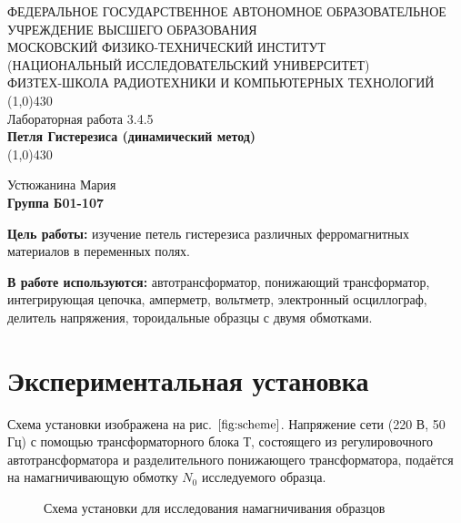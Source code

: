 \documentclass[11pt]{article}
\begin{document}
\begin{titlepage}
\begin{center}
\large{\small ФЕДЕРАЛЬНОЕ ГОСУДАРСТВЕННОЕ АВТОНОМНОЕ ОБРАЗОВАТЕЛЬНОЕ\\ УЧРЕЖДЕНИЕ ВЫСШЕГО ОБРАЗОВАНИЯ\\ МОСКОВСКИЙ ФИЗИКО-ТЕХНИЧЕСКИЙ ИНСТИТУТ\\ (НАЦИОНАЛЬНЫЙ ИССЛЕДОВАТЕЛЬСКИЙ УНИВЕРСИТЕТ)\\ ФИЗТЕХ-ШКОЛА РАДИОТЕХНИКИ И КОМПЬЮТЕРНЫХ ТЕХНОЛОГИЙ}
\vfill
\line(1,0){430}\\[1mm]
\huge{Лабораторная работа 3.4.5}\\
\huge\textbf{Петля Гистерезиса (динамический метод)}\\
\line(1,0){430}\\[1mm]
\vfill
\begin{flushright}
\normalsize{Устюжанина Мария}\\
\normalsize{\textbf{Группа Б01-107}}\\
\end{flushright}
\end{center}
\end{titlepage}

\par \textbf{Цель работы:} изучение петель гистерезиса различных ферромагнитных
материалов в переменных полях.

\par \textbf{В работе используются:} автотрансформатор, понижающий трансформатор, интегрирующая цепочка, амперметр, вольтметр, электронный осциллограф, делитель напряжения, тороидальные образцы с двумя обмотками.


\section{Экспериментальная установка}

Схема установки изображена на рис. $\ref{fig:scheme}$. Напряжение сети (220 В,
50 Гц) с помощью трансформаторного блока Т, состоящего из регулировочного автотрансформатора и разделительного понижающего трансформатора, подаётся на намагничивающую обмотку $N_0$ исследуемого образца.


\begin{figure}[H]
\caption{Схема установки для исследования намагничивания образцов}
\label{pic:3}
\end{figure}
\end{document}
